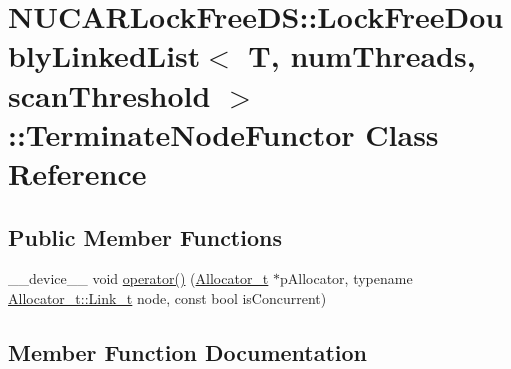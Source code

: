 \hypertarget{class_n_u_c_a_r_lock_free_d_s_1_1_lock_free_doubly_linked_list_1_1_terminate_node_functor}{}\section{N\+U\+C\+A\+R\+Lock\+Free\+DS\+:\+:Lock\+Free\+Doubly\+Linked\+List$<$ T, num\+Threads, scan\+Threshold $>$\+:\+:Terminate\+Node\+Functor Class Reference}
\label{class_n_u_c_a_r_lock_free_d_s_1_1_lock_free_doubly_linked_list_1_1_terminate_node_functor}
\subsection*{Public Member Functions}
\begin{DoxyCompactItemize}
\item 
\+\_\+\+\_\+device\+\_\+\+\_\+ void \mbox{\hyperlink{class_n_u_c_a_r_lock_free_d_s_1_1_lock_free_doubly_linked_list_1_1_terminate_node_functor_a33357a139381aac419d1914139b674da}{operator()}} (\mbox{\hyperlink{class_n_u_c_a_r_lock_free_d_s_1_1_lock_free_doubly_linked_list_af534991f4eb0641191f936a80c701e6c}{Allocator\+\_\+t}} $\ast$p\+Allocator, typename \mbox{\hyperlink{class_n_u_c_a_r_lock_free_d_s_1_1_allocator_a5508d82b795e6c1977bebb67b5e5b686}{Allocator\+\_\+t\+::\+Link\+\_\+t}} node, const bool is\+Concurrent)
\end{DoxyCompactItemize}


\subsection{Member Function Documentation}
\mbox{\label{class_n_u_c_a_r_lock_free_d_s_1_1_lock_free_doubly_linked_list_1_1_terminate_node_functor_a33357a139381aac419d1914139b674da}} 

